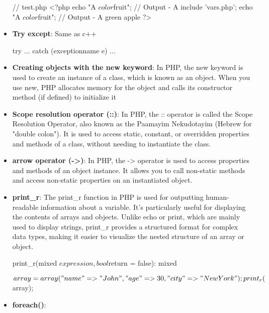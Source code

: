 \documentclass{report}
\begin{document}
\begin{itemize}
\begin{bashcode}
                // test.php
                <?php
                    echo "A $color $fruit"; // Output - A
                    include 'vars.php';
                    echo "A $color $fruit"; // Output - A green apple
                ?> 
            \end{bashcode}
        \item \textbf{Try except}: Same as c++
            \bigbreak \noindent 
            \begin{cppcode}
            try {
                ...
            }  catch (exceptionname e) {
                ...
            }
            \end{cppcode}
        \item \textbf{Creating objects with the new keyword}: In PHP, the new keyword is used to create an instance of a class, which is known as an object. When you use new, PHP allocates memory for the object and calls its constructor method (if defined) to initialize it
            \bigbreak \noindent 
        \item \textbf{Scope resolution operator (::)}: In PHP, the :: operator is called the Scope Resolution Operator, also known as the Paamayim Nekudotayim (Hebrew for "double colon"). It is used to access static, constant, or overridden properties and methods of a class, without needing to instantiate the class.
        \item \textbf{arrow operator (->)}: In PHP, the -> operator is used to access properties and methods of an object instance. It allows you to call non-static methods and access non-static properties on an instantiated object.
        \item \textbf{print\_r}: The print\_r function in PHP is used for outputting human-readable information about a variable. It's particularly useful for displaying the contents of arrays and objects. Unlike echo or print, which are mainly used to display strings, print\_r provides a structured format for complex data types, making it easier to visualize the nested structure of an array or object.
            \bigbreak \noindent 
            \begin{cppcode}
                print_r(mixed $expression, bool $return = false): mixed
            \end{cppcode}
            \bigbreak \noindent 
            \begin{cppcode}
                $array = array("name" => "John", "age" => 30, "city" => "New York");
                print_r($array);
            \end{cppcode}
        \item \textbf{foreach()}:
            \bigbreak \noindent 
\end{itemize}
\end{document}
